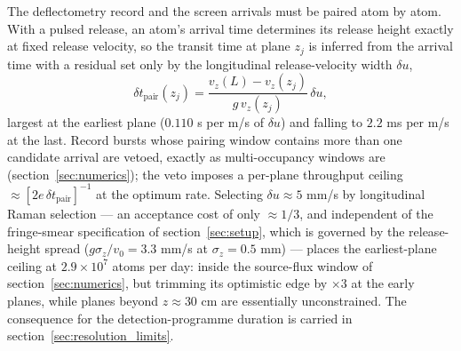 \documentclass[11pt,a4paper]{article}
\begin{document}
The deflectometry record and the screen arrivals must be paired atom by atom. With a pulsed release, an atom's arrival time determines its release height exactly at fixed release velocity, so the transit time at plane $z_j$ is inferred from the arrival time with a residual set only by the longitudinal release-velocity width $\delta u$,
\begin{equation}
\delta t_\text{pair}(z_j) = \frac{v_z(L) - v_z(z_j)}{g\,v_z(z_j)}\,\delta u,
\label{eq:pairing}
\end{equation}
largest at the earliest plane ($0.110$ s per m/s of $\delta u$) and falling to $2.2$ ms per m/s at the last. Record bursts whose pairing window contains more than one candidate arrival are vetoed, exactly as multi-occupancy windows are (section~\ref{sec:numerics}); the veto imposes a per-plane throughput ceiling $\approx [2e\,\delta t_\text{pair}]^{-1}$ at the optimum rate. Selecting $\delta u \approx 5$ mm/s by longitudinal Raman selection --- an acceptance cost of only $\approx 1/3$, and independent of the fringe-smear specification of section~\ref{sec:setup}, which is governed by the release-height spread ($g\sigma_z/v_0 = 3.3$ mm/s at $\sigma_z = 0.5$ mm) --- places the earliest-plane ceiling at $2.9\times 10^7$ atoms per day: inside the source-flux window of section~\ref{sec:numerics}, but trimming its optimistic edge by $\times 3$ at the early planes, while planes beyond $z \approx 30$ cm are essentially unconstrained. The consequence for the detection-programme duration is carried in section~\ref{sec:resolution_limits}.
\end{document}
